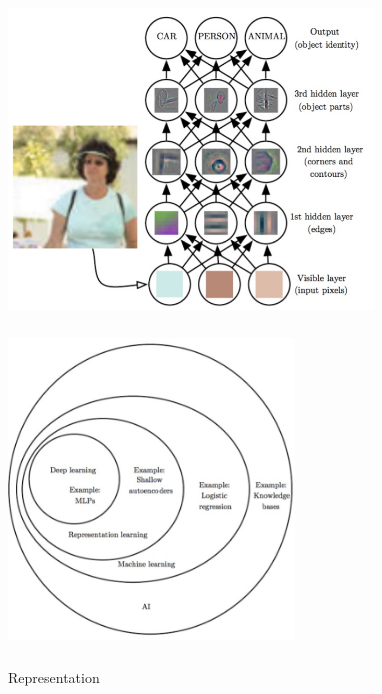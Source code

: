 \documentclass[xetex,mathserif,serif,aspectratio=169]{beamer}
\begin{document}
\begin{frame}[fragile] \frametitle{} \oldB \small

\begin{center}
\includegraphics[height=8cm]{img/representation.jpg}
\end{center}

\end{frame}

\begin{frame}[fragile] \frametitle{} \oldB \small

\begin{center}
\includegraphics[height=8cm]{img/vennDiagram.jpg}
\end{center}

\end{frame}

\begin{frame}[fragile] \frametitle{} \oldB \small

\begin{flushright}
{\color{yaleblue}\sc\fontsize{1cm}{0cm}\selectfont Representation}
\end{flushright}

\end{frame}
\end{document}
